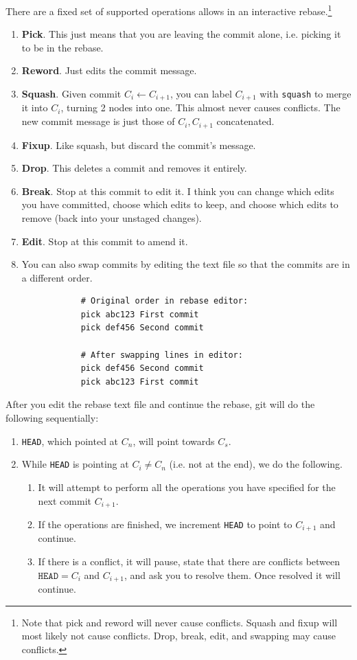 \documentclass{article}
\begin{document}
\begin{definition}[Rebasing]
      There are a fixed set of supported operations allows in an interactive rebase.\footnote{Note that pick and reword will never cause conflicts. Squash and fixup will most likely not cause conflicts. Drop, break, edit, and swapping may cause conflicts.}
      \begin{enumerate}
        \item \textbf{Pick}. This just means that you are leaving the commit alone, i.e. picking it to be in the rebase. 
        \item \textbf{Reword}. Just edits the commit message. 
        \item \textbf{Squash}. Given commit $C_i \leftarrow C_{i+1}$, you can label $C_{i+1}$ with \texttt{squash} to merge it into $C_{i}$, turning 2 nodes into one. This almost never causes conflicts. The new commit message is just those of $C_{i}, C_{i+1}$ concatenated. 
        \item \textbf{Fixup}. Like squash, but discard the commit's message.  
        \item \textbf{Drop}. This deletes a commit and removes it entirely.  
        \item \textbf{Break}. Stop at this commit to edit it. I think you can change which edits you have committed, choose which edits to keep, and choose which edits to remove (back into your unstaged changes). 
        \item \textbf{Edit}. Stop at this commit to amend it. 
        \item You can also swap commits by editing the text file so that the commits are in a different order. 
          \begin{lstlisting}
            # Original order in rebase editor:
            pick abc123 First commit
            pick def456 Second commit

            # After swapping lines in editor:
            pick def456 Second commit
            pick abc123 First commit 
          \end{lstlisting}
      \end{enumerate} 
      After you edit the rebase text file and continue the rebase, git will do the following sequentially: 
      \begin{enumerate}
        \item \texttt{HEAD}, which pointed at $C_n$, will point towards $C_s$. 

        \item While \texttt{HEAD} is pointing at $C_i \neq C_n$ (i.e. not at the end), we do the following. 
          \begin{enumerate}
            \item It will attempt to perform all the operations you have specified for the next commit $C_{i+1}$. 
            \item If the operations are finished, we increment \texttt{HEAD} to point to $C_{i+1}$ and continue. 
            \item If there is a conflict, it will pause, state that there are conflicts between $\texttt{HEAD} = C_i$ and $C_{i+1}$, and ask you to resolve them. Once resolved it will continue. 
          \end{enumerate} 


\end{enumerate}
\end{definition}
\end{document}
